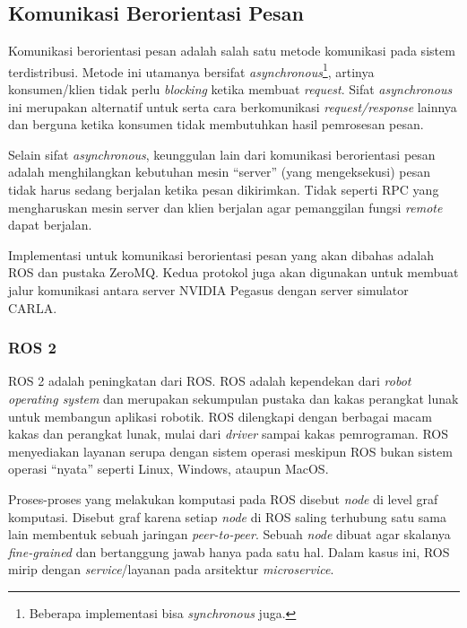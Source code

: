 \subsection{Komunikasi Berorientasi Pesan}

Komunikasi berorientasi pesan adalah salah satu metode komunikasi pada sistem
terdistribusi. Metode ini utamanya bersifat
\textit{asynchronous}\footnote{Beberapa implementasi bisa \textit{synchronous}
    juga.}, artinya konsumen/klien tidak perlu \textit{blocking} ketika membuat
\textit{request}. Sifat \textit{asynchronous} ini merupakan alternatif untuk
serta cara berkomunikasi \textit{request/response} lainnya dan berguna ketika
konsumen tidak membutuhkan hasil pemrosesan pesan.

Selain sifat \textit{asynchronous}, keunggulan lain dari komunikasi berorientasi
pesan ada\-lah menghilangkan kebutuhan mesin ``server'' (yang mengeksekusi) pesan
tidak harus sedang berjalan ketika pesan dikirimkan. Tidak seperti RPC yang
mengharuskan mesin server dan klien berjalan agar pemanggilan fungsi
\textit{remote} dapat berjalan.

Implementasi untuk komunikasi berorientasi pesan yang akan dibahas adalah ROS
dan pustaka ZeroMQ. Kedua protokol juga akan digunakan untuk membuat jalur
komunikasi antara server NVIDIA Pegasus dengan server simulator CARLA.

\subsubsection{ROS 2}

ROS 2 adalah peningkatan dari ROS. ROS adalah kependekan dari \textit{robot
    operating system} dan merupakan sekumpulan pustaka dan kakas perangkat lunak
untuk membangun aplikasi robotik. ROS dilengkapi dengan berbagai macam kakas
dan perangkat lunak, mulai dari \textit{driver} sampai kakas pemrograman. ROS
menyediakan layanan serupa dengan sistem operasi meskipun ROS bukan sistem
operasi ``nyata'' seperti Linux, Windows, ataupun MacOS.


Proses-proses yang melakukan komputasi pada ROS disebut \textit{node} di level
graf komputasi. Disebut graf karena setiap \textit{node} di ROS saling terhubung
satu sama lain membentuk sebuah jaringan \textit{peer-to-peer}. Sebuah
\textit{node} dibuat agar skalanya \textit{fine-grained} dan bertanggung jawab
hanya pada satu hal. Dalam kasus ini, ROS mirip dengan \textit{service}/layanan
pada arsitektur \textit{microservice}.

